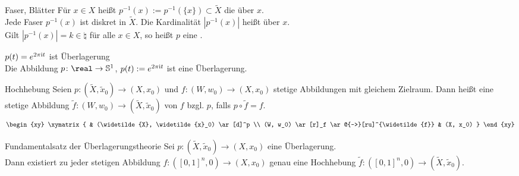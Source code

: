 \begin{Def}{Faser, Blätter}
    Für $x \in X$ heißt $p^{-1}(x) := p^{-1}(\{x\}) \subset \widetilde{X}$ die
     über $x$. \\
    Jede Faser $p^{-1}(x)$ ist diskret in $\widetilde{X}$.
    Die Kardinalität $|p^{-1}(x)|$ heißt
     über $x$. \\
    Gilt $|p^{-1}(x)| = k \in \natural$ für alle $x \in X$, so heißt $p$ eine
    .
\end{Def}

\begin{Satz}{$p(t) = e^{2\pi\mathrm{i} t}$ ist Überlagerung}\\
    Die Abbildung $p\colon \real \rightarrow \sphere^1$, $p(t) := e^{2\pi\mathrm{i} t}$
    ist eine Überlagerung.
\end{Satz}

\linie
\pagebreak

\begin{Def}{Hochhebung}
    Seien $p\colon (\widetilde{X}, \widetilde{x}_0) \rightarrow (X, x_0)$
    und $f\colon (W, w_0) \rightarrow (X, x_0)$ stetige Abbildungen mit
    gleichem Zielraum.
    Dann heißt eine stetige Abbildung
    $\widetilde{f}\colon (W, w_0) \rightarrow (\widetilde{X}, \widetilde{x}_0)$
     von $f$ bzgl. $p$, falls $p \circ \widetilde{f} = f$.
    \displaymathother
    \begin{align*}
        \begin{xy}
            \xymatrix{
                &
                (\widetilde{X}, \widetilde{x}_0) \ar[d]^p \\
                (W, w_0) \ar[r]_f \ar@{-->}[ru]^{\widetilde{f}} &
                (X, x_0)
            }
        \end{xy}
    \end{align*}
    \displaymathnormal
\end{Def}

\begin{Satz}{Fundamentalsatz der Überlagerungstheorie}
    Sei $p\colon (\widetilde{X}, \widetilde{x}_0) \rightarrow (X, x_0)$
    eine Überlagerung. \\
    Dann existiert zu jeder stetigen Abbildung
    $f\colon ([0, 1]^n, 0) \rightarrow (X, x_0)$
    genau eine Hochhebung $\widetilde{f}\colon ([0, 1]^n, 0)
    \rightarrow (\widetilde{X}, \widetilde{x}_0)$.
\end{Satz}

